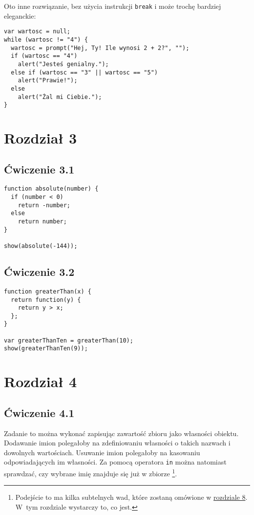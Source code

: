 Oto inne rozwiązanie, bez użycia instrukcji \texttt{break} i może trochę bardziej eleganckie:
      
\begin{verbatim} 
var wartosc = null;
while (wartosc != "4") {
  wartosc = prompt("Hej, Ty! Ile wynosi 2 + 2?", "");
  if (wartosc == "4")
    alert("Jesteś genialny.");
  else if (wartosc == "3" || wartosc == "5")
    alert("Prawie!");
  else
    alert("Żal mi Ciebie.");
}
\end{verbatim}


\section*{Rozdział 3}
\label{sol:3}

\subsection*{Ćwiczenie 3.1}
\label{sol:3.1}
      
\begin{verbatim} 
function absolute(number) {
  if (number < 0)
    return -number;
  else
    return number;
}

show(absolute(-144));
\end{verbatim}
    
\subsection*{Ćwiczenie 3.2}
\label{sol:3.2}
     
\begin{verbatim} 
function greaterThan(x) {
  return function(y) {
    return y > x;
  };
}

var greaterThanTen = greaterThan(10);
show(greaterThanTen(9));
 \end{verbatim}
 

\section*{Rozdział 4}
\label{sol:4}
    
\subsection*{Ćwiczenie 4.1}
\label{sol:4.1}

Zadanie to można wykonać zapisując zawartość zbioru jako własności obiektu. Dodawanie imion polegałoby na zdefiniowaniu własności o takich nazwach i dowolnych wartościach. Usuwanie imion polegałoby na kasowaniu odpowiadających im własności. Za pomocą operatora \texttt{in} można natomiast sprawdzać, czy wybrane imię znajduje się już w zbiorze \footnote{Podejście to ma kilka subtelnych wad, które zostaną omówione w \hyperref[chap:8]{rozdziale 8}. W~tym rozdziale wystarczy to, co jest.}.
      
